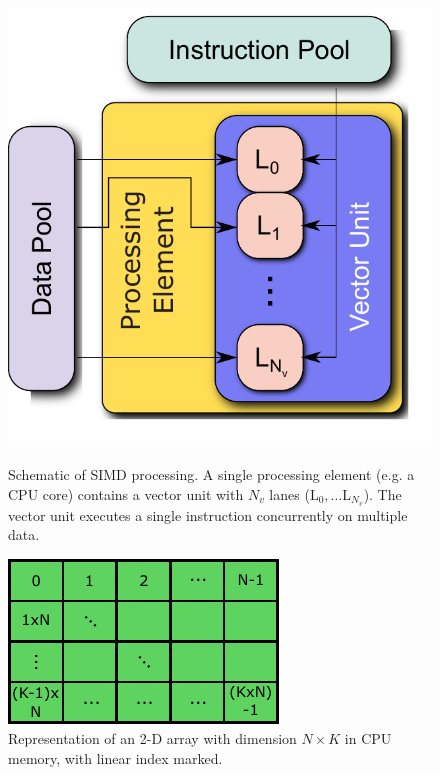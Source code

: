\documentclass[12pt]{ussci}
\begin{document}
\begin{figure}[htb]
  \centering
  \begin{minipage}[t]{0.45\linewidth}
      \includegraphics[width=\textwidth]{SIMD.pdf}
      \caption{Schematic of SIMD processing.  A single processing element (e.g. a CPU core) contains a vector unit with $N_v$ lanes ($\text{L}_0,\ldots \text{L}_{N_v}$).  The vector unit executes a single instruction concurrently on multiple data.}
      \label{F:SIMD}
  \end{minipage}
  \hfill
  \begin{minipage}[t]{0.45\linewidth}
      \includegraphics[width=\textwidth]{mem_access.pdf}
      \caption{Representation of an 2-D array with dimension $N \times K$ in CPU memory, with linear index marked.}
      \label{F:mem}
  \end{minipage}
\end{figure}
\end{document}
